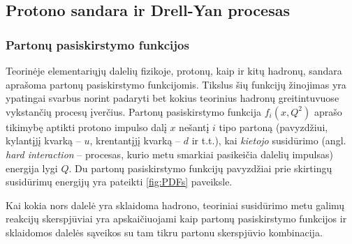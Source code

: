 \documentclass[a4paper, 12pt]{article}
\begin{document}
\subsection{Protono sandara ir Drell-Yan procesas}


\subsubsection{Partonų pasiskirstymo funkcijos}

Teorinėje elementariųjų dalelių fizikoje, protonų, kaip ir kitų hadronų, sandara aprašoma
partonų pasiskirstymo funkcijomis. Tikslus šių funkcijų žinojimas yra ypatingai svarbus
norint padaryti bet kokius teorinius hadronų greitintuvuose vykstančių procesų įverčius.
Partonų pasiskirstymo funkcija $f_{i}(x, Q^{2})$ aprašo tikimybę aptikti protono impulso
dalį $x$ nešantį $i$ tipo partoną (pavyzdžiui, kylantįjį kvarką -- $u$, krentantįjį
kvarką -- $d$ ir t.t.), kai \textit{kietojo} susidūrimo (angl. \textit{hard interaction} --
procesas, kurio metu smarkiai pasikeičia dalelių impulsas) energija lygi $Q$.
Du partonų pasiskirstymo funkcijų pavyzdžiai prie skirtingų susidūrimų energijų yra pateikti
\ref{fig:PDFs} paveiksle.

Kai kokia nors dalelė yra sklaidoma hadrono, teoriniai susidūrimo metu galimų reakcijų
skerspjūviai yra apskaičiuojami kaip partonų pasiskirstymo funkcijos ir sklaidomos dalelės
sąveikos su tam tikru partonu skerspjūvio kombinacija.
\end{document}
